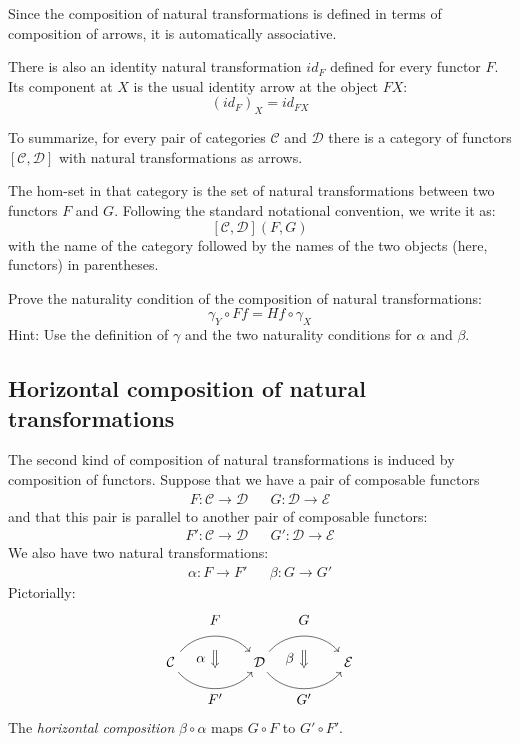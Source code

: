 \documentclass[DaoFP]{subfiles}
\begin{document}
Since the composition of natural transformations is defined in terms of composition of arrows, it is automatically associative. 

There is also an identity natural transformation $id_F$ defined for every functor $F$. Its component at $X$ is the usual identity arrow at the object $F X$:
\[ (id_F)_X = id_{F X} \]

To summarize, for every pair of categories $\mathcal{C}$ and $\mathcal{D}$ there is a category of functors $[\mathcal{C}, \mathcal{D}]$ with natural transformations as arrows. 

The hom-set in that category is the set of natural transformations between two functors $F$ and $G$. Following the standard notational convention, we write it as:
\[ [\mathcal{C}, \mathcal{D}](F, G) \]
with the name of the category followed by the names of the two objects (here, functors) in parentheses.


\begin{exercise}
Prove the naturality condition of the composition of natural transformations:
\[ \gamma_Y \circ F f = H f \circ \gamma_X \]
Hint: Use the definition of $\gamma$ and the two naturality conditions for $\alpha$ and $\beta$.
\end{exercise}

\subsection{Horizontal composition of natural transformations}

The second kind of composition of natural transformations is induced by composition of functors. Suppose that we have a pair of composable functors
\begin{align*}
 F \colon \mathcal{C} \to \mathcal{D}
&&G \colon \mathcal{D} \to \mathcal{E} 
\end{align*}
and that this pair is parallel to another pair of composable functors:
\begin{align*}
 F' \colon \mathcal{C} \to \mathcal{D}
&& G' \colon \mathcal{D} \to \mathcal{E} 
\end{align*}
We also have two natural transformations:
\begin{align*}
\alpha \colon F \to F'  
&& \beta \colon G \to G' 
\end{align*}
Pictorially:
\[
\begin{tikzcd}[column sep=huge]
\mathcal{C}
  \arrow[bend left=50]{r}[name=U, label=above:$F$]{}
  \arrow[bend right=50]{r}[name=D, label=below:$F'$]{} 
 &
\mathcal{D}
  \arrow[bend left=50]{r}[name=U1, label=above:$G$]{}
  \arrow[bend right=50]{r}[name=D1, label=below:$G'$]{} 
 &
\mathcal{E}
  \arrow[shorten <=10pt,shorten >=10pt,Rightarrow,to path={(U) -- node[label=left:$\alpha$] {} (D)}]{}
  \arrow[shorten <=10pt,shorten >=10pt,Rightarrow,to path={(U1) -- node[label=left:$\beta$] {} (D1)}]{}
\end{tikzcd}
\]
The \emph{horizontal composition} $\beta \circ \alpha$ maps $G \circ F$ to $G' \circ F'$.
\end{document}
